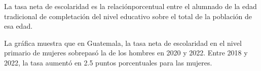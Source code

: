 La tasa neta de escolaridad es la relaciónporcentual entre el alumnado de la edad tradicional de completación del nivel educativo sobre el total de la población de esa edad.

La gráfica muestra que en Guatemala, la tasa neta de escolaridad en el nivel primario de mujeres sobrepasó la de los hombres en 2020 y 2022. Entre 2018 y 2022, la tasa aumentó en
2.5 puntos porcentuales para las mujeres.
